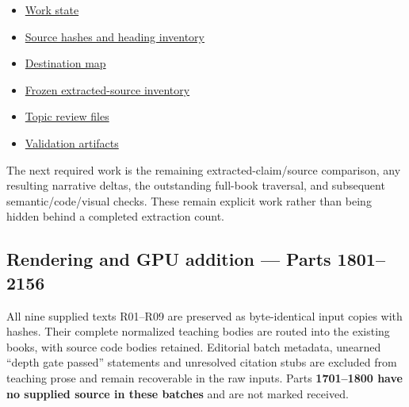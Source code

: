 \begin{itemize}
\tightlist
\item
  \hyperref[source-file-4269beda3a2effefff717ba5]{Work state}
\item
  \hyperref[source-file-f7623c3abfb6c89839dd1a79]{Source hashes and heading inventory}
\item
  \hyperref[source-file-01d62586d89798883d5fe952]{Destination map}
\item
  \hyperref[source-file-d73580b750e2bd42cec19837]{Frozen extracted-source inventory}
\item
  \href{/Users/swayamsingal/.codex/source-cache/manual-integration-2026-11-10/reviews}{Topic review files}
\item
  \href{/Users/swayamsingal/.codex/source-cache/manual-integration-2026-11-10/validation}{Validation artifacts}
\end{itemize}

The next required work is the remaining extracted-claim/source comparison, any resulting narrative deltas, the outstanding full-book traversal, and subsequent semantic/code/visual checks. These remain explicit work rather than being hidden behind a completed extraction count.

\subsection{Rendering and GPU addition --- Parts 1801--2156}\label{appendix-3b67654799a2-rendering-and-gpu-addition-parts-18012156}

All nine supplied texts R01--R09 are preserved as byte-identical input copies with hashes. Their complete normalized teaching bodies are routed into the existing books, with source code bodies retained. Editorial batch metadata, unearned ``depth gate passed'' statements and unresolved citation stubs are excluded from teaching prose and remain recoverable in the raw inputs. Parts \textbf{1701--1800 have no supplied source in these batches} and are not marked received.

